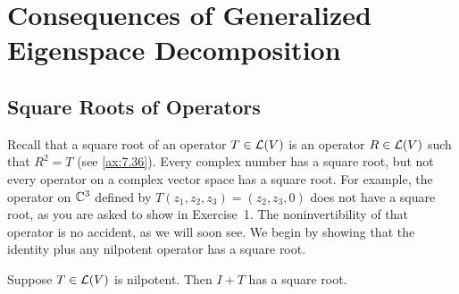 \iftestbuild %
\setcounter{section}{2}\setcounter{theorem}{38}
\fi %
\section{Consequences of Generalized Eigenspace Decomposition}

\subsection{Square Roots of Operators}

Recall that a square root of an operator $T\in\mathcal{L}(V)$ is an operator
$R\in\mathcal{L}(V)$ such that $R^2=T$ (see \ref{ax:7.36}). Every complex number has a
square root, but not every operator on a complex vector space has a square
root. For example, the operator on $\mathbb{C}^3$ defined by
$T(z_1,z_2,z_3)=(z_2,z_3,0)$ does not have a square root, as you are asked to
show in Exercise~1. The noninvertibility of that operator is no accident, as we
will soon see. We begin by showing that the identity plus any nilpotent
operator has a square root.

\begin{result}\label{ax:8.39}
Suppose $T\in\mathcal{L}(V)$ is nilpotent. Then $I+T$ has a square root.
\end{result}

